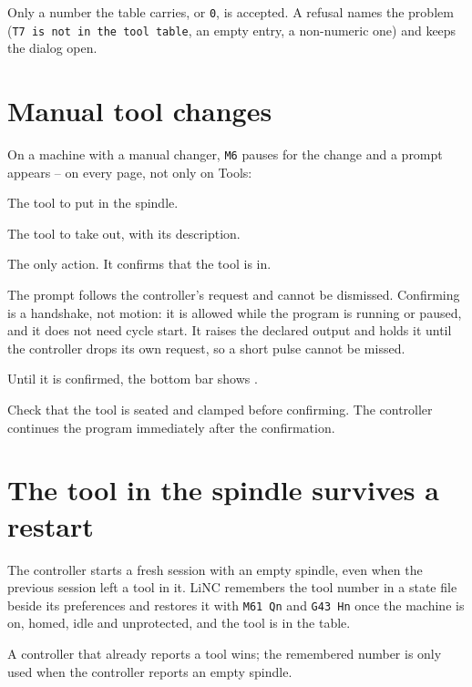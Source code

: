 Only a number the table carries, or \texttt{0}, is accepted. A refusal names the problem
(\texttt{T7 is not in the tool table}, an empty entry, a non-numeric one) and keeps the dialog
open.

\section{Manual tool changes}

On a machine with a manual changer, \texttt{M6} pauses for the change and a prompt appears --
on every page, not only on Tools:

\begin{description}[font=\normalfont\sffamily\bfseries, leftmargin=3.4cm, style=nextline]
  \item[\sbtn{INSTALL}] The tool to put in the spindle.
  \item[\sbtn{REMOVE}] The tool to take out, with its description.
  \item[\sbtn{CONFIRM}] The only action. It confirms that the tool is in.
\end{description}

The prompt follows the controller's request and cannot be dismissed. Confirming is a
handshake, not motion: it is allowed while the program is running or paused, and it does not
need cycle start. It raises the declared  output and holds it
until the controller drops its own request, so a short pulse cannot be missed.

Until it is confirmed, the bottom bar shows .

\begin{safetybox}
  Check that the tool is seated and clamped before confirming. The controller continues the
  program immediately after the confirmation.
\end{safetybox}

\section{The tool in the spindle survives a restart}

The controller starts a fresh session with an empty spindle, even when the previous session
left a tool in it. LiNC remembers the tool number in a state file beside its preferences and
restores it with \texttt{M61 Qn} and \texttt{G43 Hn} once the machine is on, homed, idle and
unprotected, and the tool is in the table.

A controller that already reports a tool wins; the remembered number is only used when the
controller reports an empty spindle.

